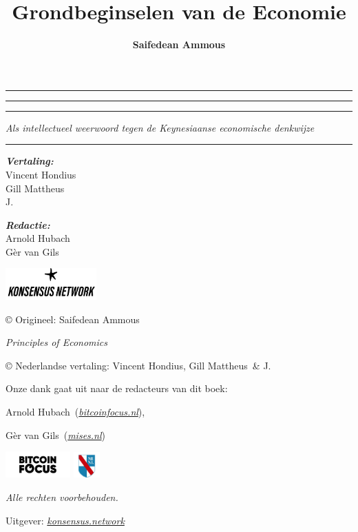 \documentclass[smalldemyvopaper,11pt,twoside,onecolumn,openright,extrafontsizes]{memoir}
\title{Grondbeginselen van de Economie}
\author{\textbf{Saifedean Ammous}}
\newcommand{\subtitle}{Als intellectueel weerwoord tegen de Keynesiaanse economische denkwijze}
\newcommand{\editor}{Arnold Hubach}
\newcommand{\editortwo}{Gèr van Gils}
\newcommand{\translatorone}{Vincent Hondius}
\newcommand{\translatortwo}{Gill Mattheus}
\newcommand{\translatorthree}{J.}
\newcommand{\translators}{
\textbf{Vertaling:}\\
\translatorone\\
\translatortwo\\
\translatorthree\\
}
\newcommand{\editors}{
\textbf{Redactie:}\\
\editor\\
\editortwo\\
}
\newcommand*\halftitlepage{\begingroup %
  \setlength\drop{0.1\textheight}
  \begin{center}
  \vspace*{\drop}
  \rule{\textwidth}{0in}\par
  {\Large\textsc\thetitle\par}
  \rule{\textwidth}{0in}\par
  \vfill
  \end{center}
\endgroup}
\newlength\drop
\newcommand*\titleM{\begingroup %
  \setlength\drop{0.15\textheight}
  \begin{center}
  \vspace*{\drop}
  \rule{\textwidth}{0in}\par
  {\huge\textsc\thetitle\par}
  \vspace{2em}
  {\large\textit{\subtitle}\par}
  \vspace{2em}
  \rule{5.5cm}{0.3mm}\par
  \vspace{2em}
  {\Large\textit\theauthor\par}
  \vspace{3em}
  {\footnotesize\textit\translators\par}
  \vspace{1em}
  {\footnotesize\textit\editors\par}
  \vfill
  \includegraphics[width=3.5cm]{figures/knw.png}\par
  \end{center}
\endgroup}
\begin{document}



\makeatletter
\renewcommand{\@seccntformat}[1]{}
\makeatother


\frontmatter
\pagestyle{empty}
\halftitlepage
\cleardoublepage
\titleM
\clearpage
\vphantom{just for the drop}
\vfill

\begin{scriptsize}
\noindent \copyright{} Origineel: Saifedean Ammous
\par\noindent \textit{Principles of Economics}

\vspace{0.5\baselineskip}

\noindent \copyright{} Nederlandse vertaling: \translatorone, \translatortwo ~\& \translatorthree
\par\noindent \textit{\thetitle}

\vspace{0.5\baselineskip}
\par\noindent Onze dank gaat uit naar de redacteurs van dit boek:
\vspace{0.25\baselineskip}

\par\noindent \editor~(\href{https://bitcoinfocus.nl}{\textit{bitcoinfocus.nl}}),
\par\noindent \editortwo~(\href{https://mises.nl}{\textit{mises.nl}})

\vspace{0.5\baselineskip}
\includegraphics[width=2.5cm]{figures/bitcoinfocus.png} \hspace{2em} \includegraphics[width=1cm]{figures/misesnl.png}
\vspace{\baselineskip}

\noindent \textit{Alle rechten voorbehouden.}

\vspace{0.5\baselineskip}

\noindent Uitgever: \href{https://konsensus.network}{\textit{konsensus.network}}

\vspace{0.5\baselineskip}


\end{scriptsize}
\end{document}
